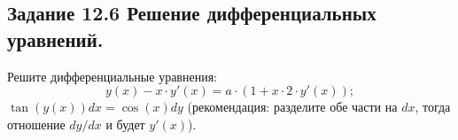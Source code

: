 \subsection*{\textbf{Задание 12.6} Решение дифференциальных уравнений.}
Решите дифференциальные уравнения:
\[
    y(x) - x\cdot y'(x) = a \cdot(1+x\cdot2\cdot y'(x));
\]
$\tan(y(x)) dx = \cos(x) dy$ (рекомендация: разделите обе части на $dx$, тогда отношение $dy/dx$ и будет $y'(x)$).

\begin{figure}[H]
    \renewcommand{\figurename}{Рисунок}
    \label{fig:image_12_6}
\end{figure}
